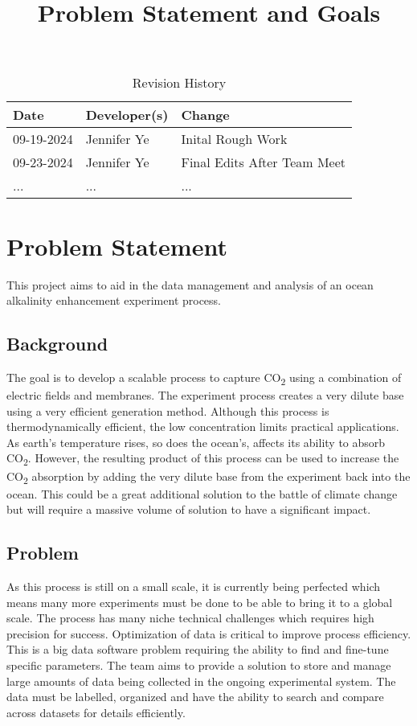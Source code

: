 \documentclass{article}
\title{Problem Statement and Goals\\\progname}
\author{\authname}
\date{}
\begin{document}
\maketitle

\begin{table}[hp]
\caption{Revision History} \label{TblRevisionHistory}
\begin{tabularx}{\textwidth}{llX}
\toprule
\textbf{Date} & \textbf{Developer(s)} & \textbf{Change}\\
\midrule
09-19-2024 & Jennifer Ye & Inital Rough Work \\
09-23-2024 & Jennifer Ye & Final Edits After Team Meet\\
... & ... & ...\\
\bottomrule
\end{tabularx}
\end{table}


\section{Problem Statement}
This project aims to aid in the data management and analysis of an ocean
alkalinity enhancement experiment process.

\subsection{Background}
The goal is to develop a scalable process to capture CO\textsubscript{2} using a
combination of electric fields and membranes. The experiment process creates a
very dilute base using a very efficient generation method. Although this process
is thermodynamically efficient, the low concentration limits practical
applications. As earth's temperature rises, so does the ocean's, affects its
ability to absorb CO\textsubscript{2}. However, the resulting product of this
process can be used to increase the CO\textsubscript{2} absorption by adding the
very dilute base from the experiment back into the ocean. This could be a great
additional solution to the battle of climate change but will require a massive
volume of solution to have a significant impact.

\subsection{Problem}
As this process is still on a small scale, it is currently being perfected which
means many more experiments must be done to be able to bring it to a global
scale. The process has many niche technical challenges which requires high
precision for success. Optimization of data is critical to improve process
efficiency. This is a big data software problem requiring the ability to find
and fine-tune specific parameters. \newline \newline
The team aims to provide a solution to store and manage large amounts of data
being collected in the ongoing experimental system. The data must be labelled,
organized and have the ability to search and compare across datasets for details
efficiently.
\end{document}

